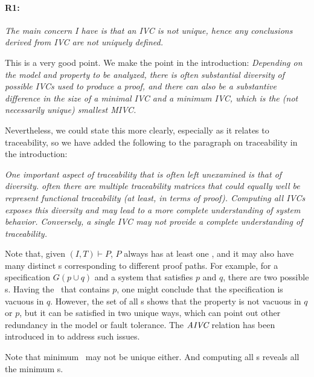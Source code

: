 \documentclass{article}
\begin{document}
\newcommand{\true}{\textsc{True}}
\newcommand{\false}{\textsc{False}}

\paragraph{R1:} \textit{The main concern I have is that an IVC is not unique, hence any conclusions derived from IVC are not uniquely defined.}

\vspace{0.05in}

\noindent This is a very good point.  We make the point in the introduction: \textit{Depending on the model and property to be analyzed, there is often substantial diversity of possible IVCs used to produce a proof, and there can also be a substantive difference in the size of a {\em minimal} IVC and a {\em minimum} IVC, which is the (not necessarily unique) smallest MIVC.}

Nevertheless, we could state this more clearly, especially as it relates to traceability, so we have added the following to the paragraph on traceability in the introduction:

\textit{One important aspect of traceability that is often left unexamined is that of diversity. often there are multiple traceability matrices that could equally well be represent functional traceability (at least, in terms of proof).  Computing all IVCs exposes this diversity and may lead to a more complete understanding of system behavior.  Conversely, a single IVC may not provide a complete understanding of traceability.}

Note that, given $(I, T) \vdash P$, $P$ always has at least one \mivc, and it may also have many distinct {\mivc}s corresponding to different proof paths.
For example, for a specification $G(p \cup q)$ and a system that satisfies $p$ and $q$, there are two possible \mivc s. Having the \mivc\ that contains $p$, one might conclude that the specification is vacuous in $q$. However, the set of all \mivc s shows that the property is not vacuous in $q$ or $p$, but it can be satisfied in two unique ways, which can point out other redundancy in the model or fault tolerance. The $\textit{AIVC}$ relation has been introduced in \cite{Murugesan16:renext} to address such issues.

 Note that minimum \mivc\ may not be unique either. And computing all \mivc s reveals all the minimum \mivc s.
\end{document}
